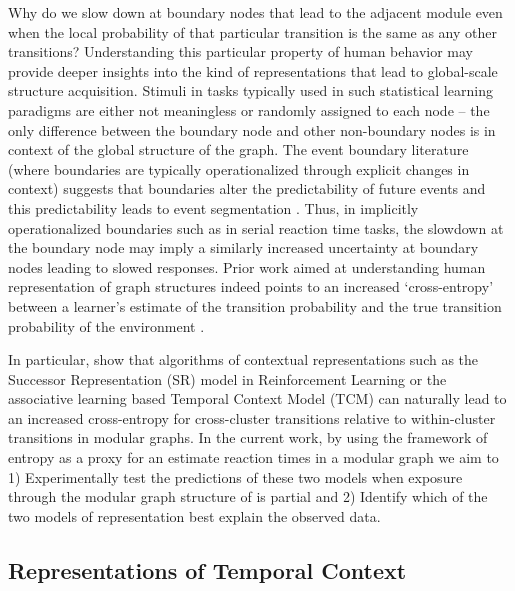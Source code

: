 Why do we slow down at boundary nodes that lead to the adjacent module even when the local probability of that particular transition is the same as any other transitions? Understanding this particular property of human behavior may provide deeper insights into the kind of representations that lead to global-scale structure acquisition. Stimuli in tasks typically used in such statistical learning paradigms are either not meaningless or randomly assigned to each node -- the only difference between the boundary node and other non-boundary nodes is in context of the global structure of the graph. The event boundary literature (where boundaries are typically operationalized through explicit changes in context) suggests that boundaries alter the predictability of future events and this predictability leads to event segmentation \parencite{zacks2007event, clewett2019transcending}. Thus, in implicitly operationalized boundaries such as in serial reaction time tasks, the slowdown at the boundary node may imply a similarly increased uncertainty at boundary nodes leading to slowed responses. Prior work aimed at understanding human representation of graph structures indeed points to an increased `cross-entropy' between a learner's estimate of the transition probability and the true transition probability of the environment \parencite{lynn2020abstract, lynn2020humans, lynn2020human}. 


In particular, \cite{lynn2020human} show that algorithms of contextual representations such as the Successor Representation (SR) model in Reinforcement Learning \parencite{dayan1993improving, momennejad2017successor, gershman2018successor} or the associative learning based Temporal Context Model (TCM) can naturally lead to an increased cross-entropy for cross-cluster transitions relative to within-cluster transitions in modular graphs. In the current work, by using the framework of entropy as a proxy for an estimate reaction times in a modular graph we aim to 1) Experimentally test the predictions of these two models when exposure through the modular graph structure of is partial and 2) Identify which of the two models of representation best explain the observed data. 

\subsection{Representations of Temporal Context}

